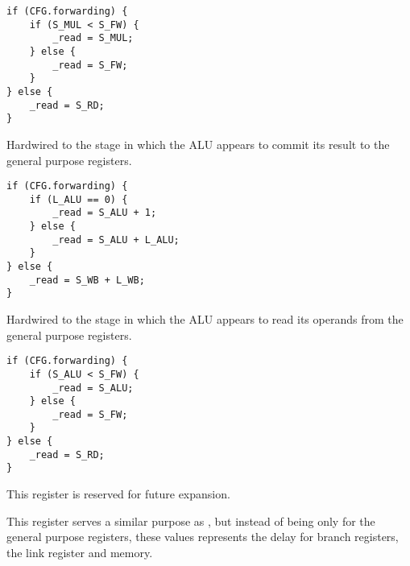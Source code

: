 \reset{****}
\implementation{}
\begin{lstlisting}
if (CFG.forwarding) {
    if (S_MUL < S_FW) {
        _read = S_MUL;
    } else {
        _read = S_FW;
    }
} else {
    _read = S_RD;
}
\end{lstlisting}

Hardwired to the stage in which the ALU appears to commit its result to the
general purpose registers.

\reset{****}
\implementation{}
\begin{lstlisting}
if (CFG.forwarding) {
    if (L_ALU == 0) {
        _read = S_ALU + 1;
    } else {
        _read = S_ALU + L_ALU;
    }
} else {
    _read = S_WB + L_WB;
}
\end{lstlisting}

Hardwired to the stage in which the ALU appears to read its operands from the
general purpose registers.

\reset{****}
\implementation{}
\begin{lstlisting}
if (CFG.forwarding) {
    if (S_ALU < S_FW) {
        _read = S_ALU;
    } else {
        _read = S_FW;
    }
} else {
    _read = S_RD;
}
\end{lstlisting}


This register is reserved for future expansion.


This register serves a similar purpose as , but instead of being only
for the general purpose registers, these values represents the delay for branch
registers, the link register and memory.

